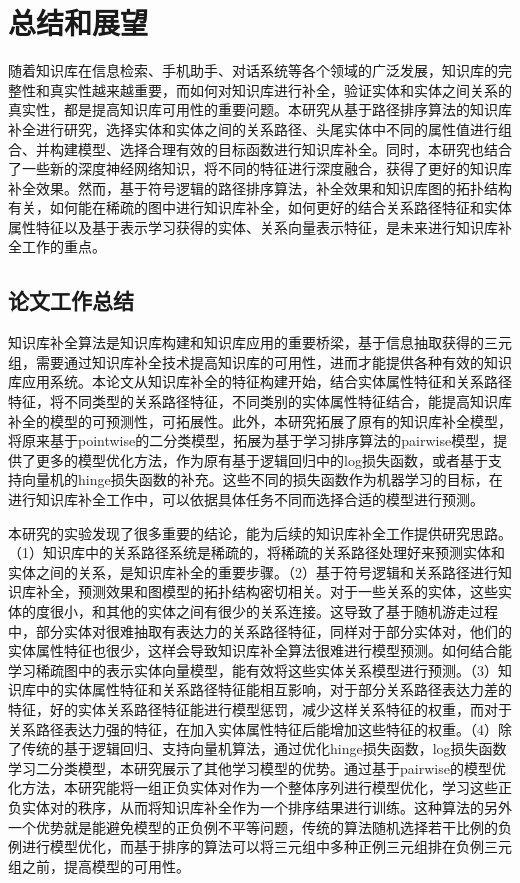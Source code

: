 
\chapter{总结和展望}
随着知识库在信息检索、手机助手、对话系统等各个领域的广泛发展，知识库的完整性和真实性越来越重要，而如何对知识库进行补全，验证实体和实体之间关系的真实性，都是提高知识库可用性的重要问题。本研究从基于路径排序算法的知识库补全进行研究，选择实体和实体之间的关系路径、头尾实体中不同的属性值进行组合、并构建模型、选择合理有效的目标函数进行知识库补全。同时，本研究也结合了一些新的深度神经网络知识，将不同的特征进行深度融合，获得了更好的知识库补全效果。然而，基于符号逻辑的路径排序算法，补全效果和知识库图的拓扑结构有关，如何能在稀疏的图中进行知识库补全，如何更好的结合关系路径特征和实体属性特征以及基于表示学习获得的实体、关系向量表示特征，是未来进行知识库补全工作的重点。

\section{论文工作总结}
知识库补全算法是知识库构建和知识库应用的重要桥梁，基于信息抽取获得的三元组，需要通过知识库补全技术提高知识库的可用性，进而才能提供各种有效的知识库应用系统。本论文从知识库补全的特征构建开始，结合实体属性特征和关系路径特征，将不同类型的关系路径特征，不同类别的实体属性特征结合，能提高知识库补全的模型的可预测性，可拓展性。此外，本研究拓展了原有的知识库补全模型，将原来基于pointwise的二分类模型，拓展为基于学习排序算法的pairwise模型，提供了更多的模型优化方法，作为原有基于逻辑回归中的log损失函数，或者基于支持向量机的hinge损失函数的补充。这些不同的损失函数作为机器学习的目标，在进行知识库补全工作中，可以依据具体任务不同而选择合适的模型进行预测。

本研究的实验发现了很多重要的结论，能为后续的知识库补全工作提供研究思路。（1）知识库中的关系路径系统是稀疏的，将稀疏的关系路径处理好来预测实体和实体之间的关系，是知识库补全的重要步骤。（2）基于符号逻辑和关系路径进行知识库补全，预测效果和图模型的拓扑结构密切相关。对于一些关系的实体，这些实体的度很小，和其他的实体之间有很少的关系连接。这导致了基于随机游走过程中，部分实体对很难抽取有表达力的关系路径特征，同样对于部分实体对，他们的实体属性特征也很少，这样会导致知识库补全算法很难进行模型预测。如何结合能学习稀疏图中的表示实体向量模型，能有效将这些实体关系模型进行预测。（3）知识库中的实体属性特征和关系路径特征能相互影响，对于部分关系路径表达力差的特征，好的实体关系路径特征能进行模型惩罚，减少这样关系特征的权重，而对于关系路径表达力强的特征，在加入实体属性特征后能增加这些特征的权重。（4）除了传统的基于逻辑回归、支持向量机算法，通过优化hinge损失函数，log损失函数学习二分类模型，本研究展示了其他学习模型的优势。通过基于pairwise的模型优化方法，本研究能将一组正负实体对作为一个整体序列进行模型优化，学习这些正负实体对的秩序，从而将知识库补全作为一个排序结果进行训练。这种算法的另外一个优势就是能避免模型的正负例不平等问题，传统的算法随机选择若干比例的负例进行模型优化，而基于排序的算法可以将三元组中多种正例三元组排在负例三元组之前，提高模型的可用性。



